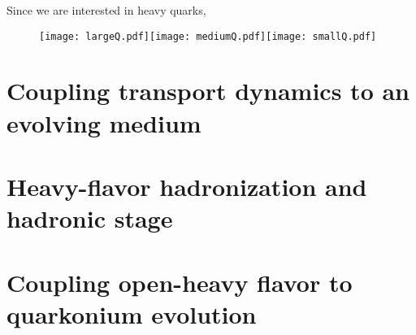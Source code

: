 Since we are interested in heavy quarks,


\begin{figure}
\texttt{[image: largeQ.pdf]}\texttt{[image: mediumQ.pdf]}\texttt{[image: smallQ.pdf]}
\caption{}
\label{fig:vac-med-interface}
\end{figure}


\section{Coupling transport dynamics to an evolving medium}

\section{Heavy-flavor hadronization and hadronic stage}

\section{Coupling open-heavy flavor to quarkonium evolution}
